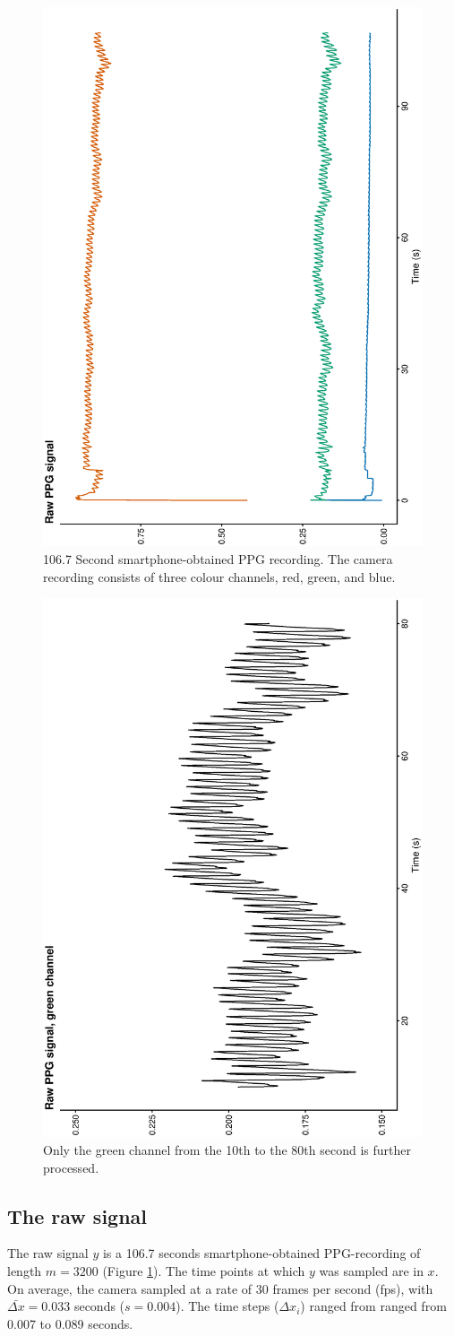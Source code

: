 \documentclass[twocolumn]{bmcart}%
\begin{document}
\begin{figure}[h]     \includegraphics[height=0.4\textwidth, angle=270]{rawsignal}
    \caption{
    106.7 Second smartphone-obtained PPG recording. The camera recording consists of three colour channels, red, green, and blue.}
    \label{fig:rawsignal}
\end{figure}

\begin{figure}[h] 
    \includegraphics[height=0.4\textwidth, angle=270]{greensignal}
    \caption{
    Only the green channel from the 10th to the 80th second is further processed.}
    	\label{fig:green}
\end{figure}


\subsection*{The raw signal}
The raw signal $y$ is a 106.7 seconds smartphone-obtained PPG-recording of length $m = 3200$ (Figure \ref{fig:rawsignal}).
The time points at which $y$ was sampled are in $x$. 
On average, the camera sampled at a rate of 30 frames per second (fps), with $\bar{\Delta x} = 0.033$ seconds ($s = 0.004$). The time steps ($\Delta x_i$) ranged from ranged from 0.007 to 0.089 seconds. 
\end{document}
